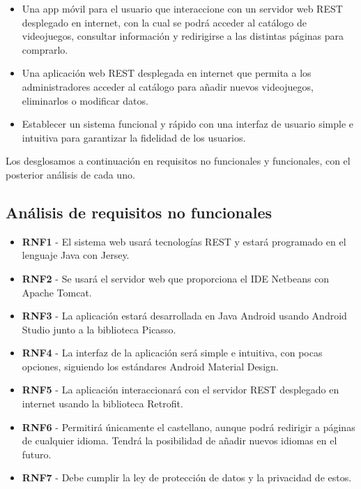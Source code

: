 \documentclass[11pt, spanish]{article}
\begin{document}
\begin{itemize}
\item Una app móvil para el usuario que interaccione con un servidor web REST desplegado en internet, con la cual se podrá acceder al catálogo de videojuegos, consultar información y redirigirse a las distintas páginas para comprarlo.

\item Una aplicación web REST desplegada en internet que permita a los administradores acceder al catálogo para añadir nuevos videojuegos, eliminarlos o modificar datos.

\item Establecer un sistema funcional y rápido con una interfaz de usuario simple e intuitiva para garantizar la fidelidad de los usuarios.
\end{itemize}

Los desglosamos a continuación en requisitos no funcionales y funcionales, con el posterior análisis de cada uno.

\subsection{Análisis de requisitos no funcionales}

\begin{itemize}
\item \textbf{RNF1} - El sistema web usará tecnologías REST y estará programado en el lenguaje Java con Jersey.

\item \textbf{RNF2} - Se usará el servidor web que proporciona el IDE Netbeans con Apache Tomcat.

\item \textbf{RNF3} - La aplicación estará desarrollada en Java Android usando Android Studio junto a la biblioteca Picasso.

\item \textbf{RNF4} - La interfaz de la aplicación será simple e intuitiva, con pocas opciones, siguiendo los estándares Android Material Design.

\item \textbf{RNF5} - La aplicación interaccionará con el servidor REST desplegado en internet usando la biblioteca Retrofit.

\item \textbf{RNF6} - Permitirá únicamente el castellano, aunque podrá redirigir a páginas de cualquier idioma. Tendrá la posibilidad de añadir nuevos idiomas en el futuro.

\item \textbf{RNF7} - Debe cumplir la ley de protección de datos y la privacidad de estos.
\end{itemize}
\end{document}
